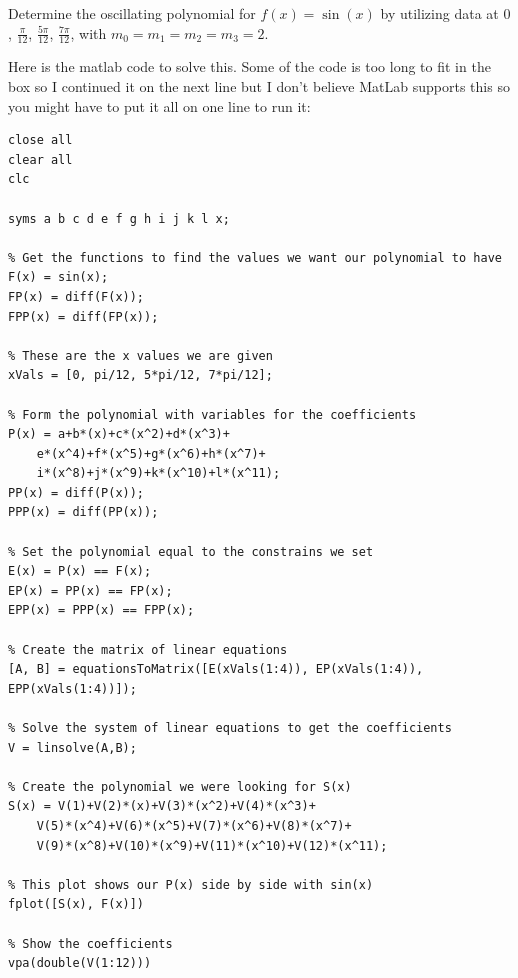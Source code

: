 \documentclass[12 pt, letterpaper]{exam}
\theoremstyle{definition}
\begin{document}
\begin{questions}
\begin{solution}
\end{solution}
\question[50] Determine the oscillating polynomial for $f(x) = \sin(x)$ by utilizing data at $0$, $\frac{\pi}{12}$, $\frac{5\pi}{12}$, $\frac{7\pi}{12}$, with $m_0=m_1=m_2=m_3=2$.
    \begin{solution}
        Here is the matlab code to solve this. Some of the code is too long to fit in the box so I continued it on the next line but I don't believe MatLab supports this so you might have to put it all on one line to run it:
        \begin{lstlisting}
close all
clear all
clc
    
syms a b c d e f g h i j k l x;

% Get the functions to find the values we want our polynomial to have
F(x) = sin(x);
FP(x) = diff(F(x));
FPP(x) = diff(FP(x));

% These are the x values we are given
xVals = [0, pi/12, 5*pi/12, 7*pi/12];

% Form the polynomial with variables for the coefficients
P(x) = a+b*(x)+c*(x^2)+d*(x^3)+
    e*(x^4)+f*(x^5)+g*(x^6)+h*(x^7)+
    i*(x^8)+j*(x^9)+k*(x^10)+l*(x^11);
PP(x) = diff(P(x));
PPP(x) = diff(PP(x));

% Set the polynomial equal to the constrains we set
E(x) = P(x) == F(x);
EP(x) = PP(x) == FP(x);
EPP(x) = PPP(x) == FPP(x);

% Create the matrix of linear equations
[A, B] = equationsToMatrix([E(xVals(1:4)), EP(xVals(1:4)), EPP(xVals(1:4))]);
    
% Solve the system of linear equations to get the coefficients
V = linsolve(A,B);

% Create the polynomial we were looking for S(x)
S(x) = V(1)+V(2)*(x)+V(3)*(x^2)+V(4)*(x^3)+
    V(5)*(x^4)+V(6)*(x^5)+V(7)*(x^6)+V(8)*(x^7)+
    V(9)*(x^8)+V(10)*(x^9)+V(11)*(x^10)+V(12)*(x^11);

% This plot shows our P(x) side by side with sin(x)
fplot([S(x), F(x)])

% Show the coefficients
vpa(double(V(1:12)))


\end{lstlisting}
\end{solution}
\end{questions}
\end{document}
